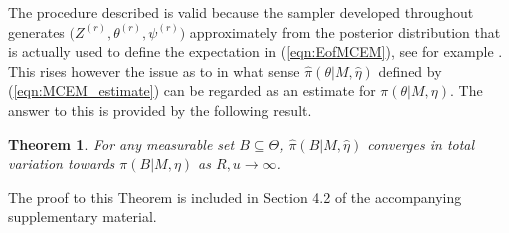 \documentclass{bioinfo}
\newtheorem{thrm}{Theorem}
\begin{document}
The procedure described is valid because the sampler developed
throughout generates $\big(Z^{(r)}, \theta^{(r)}, \psi^{(r)}\big)$
approximately from the posterior distribution that is actually used to
define the expectation in (\ref{eqn:EofMCEM}), see for example
\cite{FM}. This rises however the issue as to in what sense
$\widehat\pi(\theta|M, \hat\eta)$ defined by
(\ref{eqn:MCEM_estimate}) can be regarded as an estimate for
$\pi(\theta|M, \eta)$. The answer to this is provided by the following
result.

\begin{thrm} For any measurable set $B\subseteq
\Theta$, $\widehat\pi(B|M,\hat\eta)$ converges in total variation
towards $\pi(B|M,\eta)$ as $R, u \to \infty$.
\end{thrm}

The proof to this Theorem is included in Section 4.2 of the
accompanying supplementary material.




\end{document}
